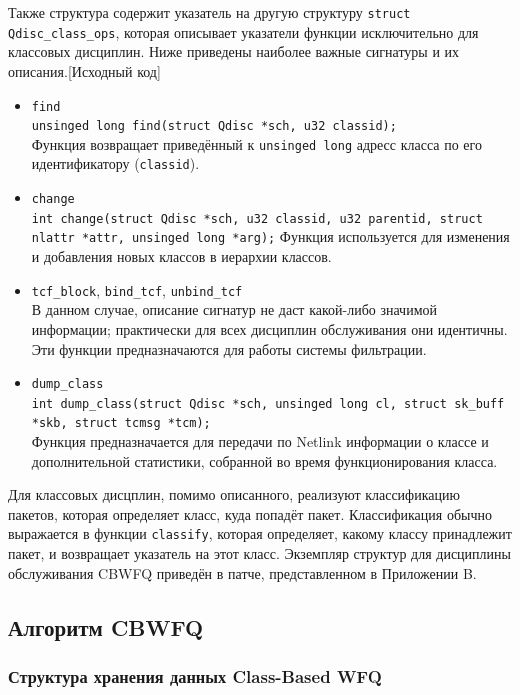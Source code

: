 	Также структура содержит указатель на другую структуру \lstinline{struct Qdisc_class_ops},
	которая описывает указатели функции исключительно для классовых дисциплин.
	Ниже приведены наиболее важные сигнатуры и их описания.[Исходный код]
	\begin{itemize}
		\item \lstinline{find}\\
			\lstinline{unsinged long find(struct Qdisc *sch, u32 classid);}\\
			Функция возвращает приведённый к \lstinline{unsinged long} адресс класса по его идентификатору (\lstinline{classid}).
		\item \lstinline{change} \\
			\lstinline{int change(struct Qdisc *sch, u32 classid, u32 parentid, struct nlattr *attr, unsinged long *arg);}
			Функция используется для изменения и добавления новых классов в иерархии классов. 
		\item \lstinline{tcf_block}, \lstinline{bind_tcf}, \lstinline{unbind_tcf}\\
			В данном случае, описание сигнатур не даст какой-либо значимой информации; практически
			для всех дисциплин обслуживания они идентичны. Эти функции предназначаются для работы
			системы фильтрации.
		\item \lstinline{dump_class}\\
			\lstinline{int dump_class(struct Qdisc *sch, unsinged long cl, struct sk_buff *skb, struct tcmsg *tcm);} \\
			Функция предназначается для передачи по Netlink информации о классе и дополнительной статистики, собранной
			во время функционирования класса.
	\end{itemize}

	Для классовых дисцплин, помимо описанного, реализуют классификацию пакетов, которая
	определяет класс, куда попадёт пакет. Классификация обычно выражается в функции \lstinline{classify},
	которая определяет, какому классу принадлежит пакет, и возвращает указатель на этот класс.
	Экземпляр структур для дисциплины обслуживания CBWFQ приведён в патче, представленном в Приложении B.

	\subsection{Алгоритм CBWFQ}

		\subsubsection{Структура хранения данных Class-Based WFQ}

